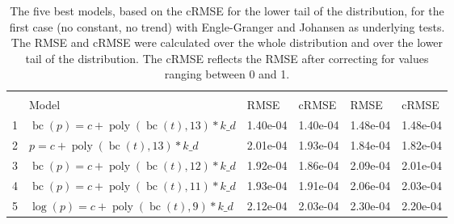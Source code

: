 \documentclass[12pt,a4paper]{article}
\DeclareMathOperator{\bc}{bc}
\DeclareMathOperator{\poly}{poly}
\begin{document}
\begin{table}[!h]

\caption{\label{tab:5_best_e_j_1}\label{tab:best_e_j_1} The five best models, based on the cRMSE for the lower tail of the distribution, for the first case (no constant, no trend) with Engle-Granger and Johansen as underlying tests. The RMSE and cRMSE were calculated over the whole distribution and over the lower tail of the distribution. The cRMSE reflects the RMSE after correcting for values ranging between 0 and 1.}
\centering
\fontsize{10}{12}\selectfont
\begin{tabular}[t]{ll>{\raggedleft\arraybackslash}p{2cm}>{\raggedleft\arraybackslash}p{2cm}>{\raggedleft\arraybackslash}p{2cm}>{\raggedleft\arraybackslash}p{2cm}}
\toprule
\multicolumn{1}{c}{\textbf{}} & \multicolumn{1}{c}{\textbf{}} & \multicolumn{2}{c}{\textbf{Full Distribution}} & \multicolumn{2}{c}{\textbf{Lower Tail ($p \leq 0.2$)}} \\
\cmidrule(l{3pt}r{3pt}){3-4} \cmidrule(l{3pt}r{3pt}){5-6}
  & Model & RMSE & cRMSE & RMSE & cRMSE\\
\midrule
\rowcolor{gray!6}  1 & $\bc(p) = c + \poly\left( \bc(t), 13 \right) * k\_d$ & 1.40e-04 & 1.40e-04 & 1.48e-04 & 1.48e-04\\
2 & $p = c + \poly\left( \bc(t), 13 \right) * k\_d$ & 2.01e-04 & 1.93e-04 & 1.84e-04 & 1.82e-04\\
\rowcolor{gray!6}  3 & $\bc(p) = c + \poly\left( \bc(t), 12 \right) * k\_d$ & 1.92e-04 & 1.86e-04 & 2.09e-04 & 2.01e-04\\
4 & $\bc(p) = c + \poly\left( \bc(t), 11 \right) * k\_d$ & 1.93e-04 & 1.91e-04 & 2.06e-04 & 2.03e-04\\
\rowcolor{gray!6}  5 & $\log(p) = c + \poly\left( \bc(t), 9 \right) * k\_d$ & 2.12e-04 & 2.03e-04 & 2.30e-04 & 2.20e-04\\
\bottomrule
\end{tabular}
\end{table}
\end{document}
